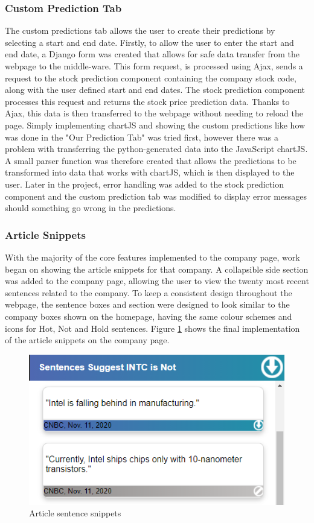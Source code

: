             \subsubsection{Custom Prediction Tab}
            The custom predictions tab allows the user to create their predictions by selecting a start and end date. Firstly, to allow the user to enter the start and end date, a Django form was created that allows for safe data transfer from the webpage to the middle-ware. This form request, is processed using Ajax, sends a request to the stock prediction component containing the company stock code, along with the user defined start and end dates. The stock prediction component processes this request and returns the stock price prediction data. Thanks to Ajax, this data is then transferred to the webpage without needing to reload the page. Simply implementing chartJS and showing the custom predictions like how was done in the "Our Prediction Tab" was tried first, however there was a problem with transferring the python-generated data into the JavaScript chartJS. A small parser function was therefore created that allows the predictions to be transformed into data that works with chartJS, which is then displayed to the user. Later in the project, error handling was added to the stock prediction component and the custom prediction tab was modified to display error messages should something go wrong in the predictions. 
            
            \subsubsection{Article Snippets}
            With the majority of the core features implemented to the company page, work began on showing the article snippets for that company. A collapsible side section was added to the company page, allowing the user to view the twenty most recent sentences related to the company. To keep a consistent design throughout the webpage, the sentence boxes and section were designed to look similar to the company boxes shown on the homepage, having the same colour schemes and icons for Hot, Not and Hold sentences. Figure \ref{fig:snippets} shows the final implementation of the article snippets on the company page.
            
            \begin{figure}[!h]
                \centering
                \includegraphics[width=0.5\linewidth]{images/upload/Snippets.PNG}
                \caption{Article sentence snippets}
                \label{fig:snippets}
            \end{figure}
            
